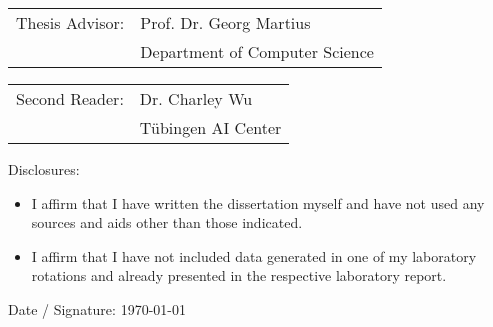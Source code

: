 \begin{titlepage}
    \vspace*{1cm}

    \vfill

    \begin{tabular}{@{}ll}
        Thesis Advisor: \hspace{0.5cm} & Prof. Dr. Georg Martius\\
                        & Department of Computer Science
    \end{tabular}
  
    \vspace{36pt}

    \begin{tabular}{@{}ll}
        Second Reader: \hspace{0.5cm} & Dr. Charley Wu\\
                        & Tübingen AI Center
    \end{tabular}
    
    \vspace{46pt}

    Disclosures:
    \begin{itemize}
        \item I affirm that I have written the dissertation myself and have not used any sources and aids other than those indicated.
        \item I affirm that I have not included data generated in one of my laboratory rotations and already presented in the respective laboratory report.
    \end{itemize}
    
    \vspace{36pt}
    
    Date / Signature: \hspace{0.6cm} \today

    \vspace*{1in}
\end{titlepage}